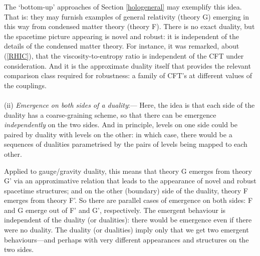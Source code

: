 \documentclass[12pt]{article}
\renewcommand{\^}[1]{\hat{#1}}
\newcommand{\eq}[1]{(\ref{#1})}
\begin{document}
The `bottom-up' approaches of Section \ref{hologeneral} may exemplify this idea. That is: they may furnish examples of  general relativity (theory G) emerging in this way from condensed matter theory (theory F). There is no exact duality, but the spacetime picture appearing is novel and robust: it is independent of the details of the condensed matter theory. For instance, it was remarked, about \eq{RHIC}, that the viscosity-to-entropy ratio is independent of the CFT under consideration. And it is the approximate duality itself that provides the relevant comparison class required for robustness: a family of CFT's at different values of the couplings.\\
\\
(ii) {\it Emergence on both sides of a duality}:--- Here, the idea is that each side of the duality has a coarse-graining scheme, so that there can be emergence {\em independently} on the two sides. And in principle, levels on one side could be paired by duality with levels on the other: in which case, there would be a sequences of dualities parametrised by the pairs of levels being mapped to each other.

Applied to gauge/gravity duality, this means that theory G emerges from theory G'  via an approximative relation that leads to the appearance of novel and robust spacetime structures; and on the other (boundary) side of the duality, theory F emerges from theory F'. So there are parallel cases of emergence on both sides: F and G emerge out of F' and G', respectively. The emergent behaviour is  independent of the duality (or dualities): there would be emergence even if there were no duality. The duality (or dualities) imply only that we get two emergent behaviours---and perhaps with very different appearances and structures  on the two sides.
\end{document}
